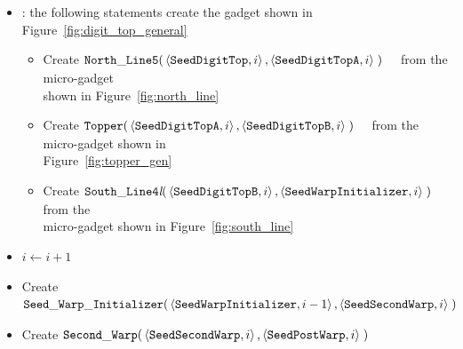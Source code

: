 \begin{itemize}
    \item {\dtop}: the following statements create the gadget shown in Figure~\ref{fig:digit_top_general}
    \begin{itemize}
        \item Create
        $\begin{aligned}[t]
            {\tt North\_Line5}(& \left \langle {\tt SeedDigitTop},  i \right\rangle,
                                 \left \langle {\tt SeedDigitTopA}, i \right\rangle \;)
        \end{aligned}$ from the micro-gadget\\shown in Figure~\ref{fig:north_line}

        \item Create
        $\begin{aligned}[t]
            {\tt Topper}(& \left \langle {\tt SeedDigitTopA}, i \right\rangle,
                           \left \langle {\tt SeedDigitTopB}, i \right\rangle \;)
        \end{aligned}$ from the micro-gadget shown in\\ Figure~\ref{fig:topper_gen}

        \item Create
        $\begin{aligned}[t]
            {\tt South\_Line4\textit{l}}(& \left \langle {\tt SeedDigitTopB},       i \right\rangle,
                                           \left \langle {\tt SeedWarpInitializer}, i \right\rangle \;)
        \end{aligned}$ from the\\micro-gadget shown in Figure~\ref{fig:south_line}
    \end{itemize}

    \item $i \gets i + 1$

    \item Create
    $\begin{aligned}[t]
            {\tt Seed\_Warp\_Initializer}(&\left\langle {\tt SeedWarpInitializer}, i - 1 \right\rangle,
                                           \left\langle {\tt SeedSecondWarp}, i     \right\rangle \;)
    \end{aligned}$

    \item Create
    $\begin{aligned}[t]
        {\tt Second\_Warp}(&\left\langle {\tt SeedSecondWarp}, i  \right\rangle,
                     \left\langle {\tt SeedPostWarp},   i \right\rangle \;)
    \end{aligned}$


\end{itemize}
